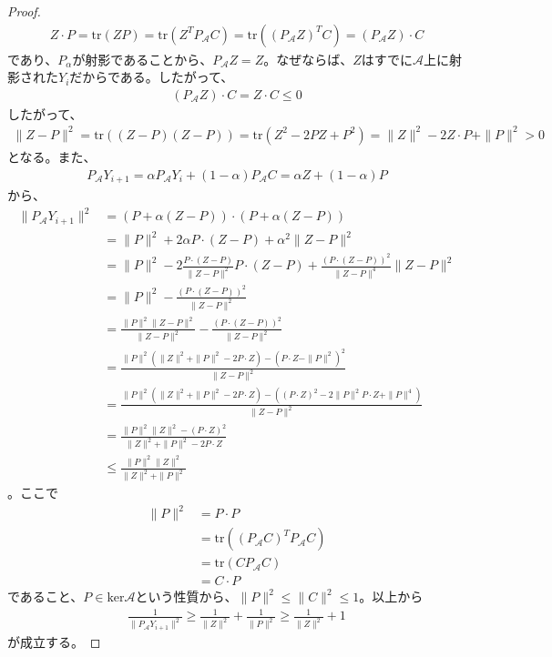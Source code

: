 \begin{proof}
  \begin{align*}
    Z \cdot P = \mathrm{tr}(Z P) = \mathrm{tr}(Z^T P_\mathcal{A} C) = \mathrm{tr}((P_\mathcal{A} Z)^T C) = (P_\mathcal{A} Z) \cdot C
  \end{align*}
  であり、$P_\alpha$が射影であることから、$P_\mathcal{A} Z = Z$。なぜならば、$Z$はすでに$\mathcal{A}$上に射影された$Y_i$だからである。したがって、
  \begin{align*}
    (P_\mathcal{A} Z) \cdot C = Z \cdot C \leq 0
  \end{align*}
  したがって、
  \begin{align*}
    \|Z - P\|^2 = \mathrm{tr}((Z - P)(Z - P)) = \mathrm{tr}(Z^2 - 2 P Z + P^2) = \|Z\|^2 - 2 Z \cdot P + \|P\|^2 > 0
  \end{align*}
  となる。また、
  \begin{align*}
    P_\mathcal{A} Y_{i + 1} = \alpha P_\mathcal{A} Y_i + (1 - \alpha) P_\mathcal{A} C = \alpha Z + (1 - \alpha) P
  \end{align*}
  から、
  \begin{align*}
    \|P_\mathcal{A} Y_{i + 1}\|^2 & = (P + \alpha (Z - P)) \cdot (P + \alpha (Z - P)) \\
                                  & = \|P\|^2 + 2 \alpha P \cdot (Z - P) + \alpha^2 \|Z - P\|^2 \\
                                  & = \|P\|^2 - 2 \frac{P \cdot (Z - P)}{\|Z - P\|^2} P \cdot (Z - P) + \frac{(P \cdot (Z - P))^2}{\|Z - P\|^4} \|Z - P\|^2 \\
                                  & = \|P\|^2 - \frac{(P \cdot (Z - P))^2}{\|Z - P\|^2} \\
                                  & = \frac{\|P\|^2 \|Z - P\|^2}{\|Z - P\|^2} - \frac{(P \cdot (Z - P))^2}{\|Z - P\|^2} \\
                                  & = \frac{\|P\|^2 (\|Z\|^2 + \|P\|^2 - 2 P \cdot Z) - (P \cdot Z - \|P\|^2)^2}{\|Z - P\|^2} \\
                                  & = \frac{\|P\|^2 (\|Z\|^2 + \|P\|^2 - 2 P \cdot Z) - ((P \cdot Z)^2 - 2 \|P\|^2 P \cdot Z + \|P\|^4)}{\|Z - P\|^2} \\
                                  & = \frac{\|P\|^2 \|Z\|^2 - (P \cdot Z)^2}{\|Z\|^2 + \|P\|^2 - 2 P \cdot Z} \\
                                  & \leq \frac{\|P\|^2 \|Z\|^2}{\|Z\|^2 + \|P\|^2}
  \end{align*}
  。ここで
  \begin{align*}
    \|P\|^2 & = P \cdot P \\
            & = \mathrm{tr}((P_\mathcal{A} C)^T P_\mathcal{A} C)\\
            & = \mathrm{tr}(C P_\mathcal{A} C) \\
            & = C \cdot P
  \end{align*}
  であること、$P \in \mathrm{ker} \mathcal{A}$という性質から、$\|P\|^2 \leq \|C\|^2 \leq 1$。以上から
  \begin{align*}
    \frac{1}{\|P_\mathcal{A} Y_{i + 1}\|^2} \geq \frac{1}{\|Z\|^2} + \frac{1}{\|P\|^2} \geq \frac{1}{\|Z\|^2} + 1
  \end{align*}
  が成立する。
\end{proof}
